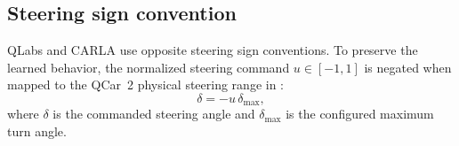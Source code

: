 \subsection{Steering sign convention}
\label{sec:steering-sign}
QLabs and CARLA use opposite steering sign conventions. To preserve the learned behavior, the normalized steering command $u\in[-1,1]$ is negated when mapped to the QCar~2 physical steering range in :
\begin{equation}
 \delta = -u\,\delta_{\max},
\end{equation}
where $\delta$ is the commanded steering angle and $\delta_{\max}$ is the configured maximum turn angle.
